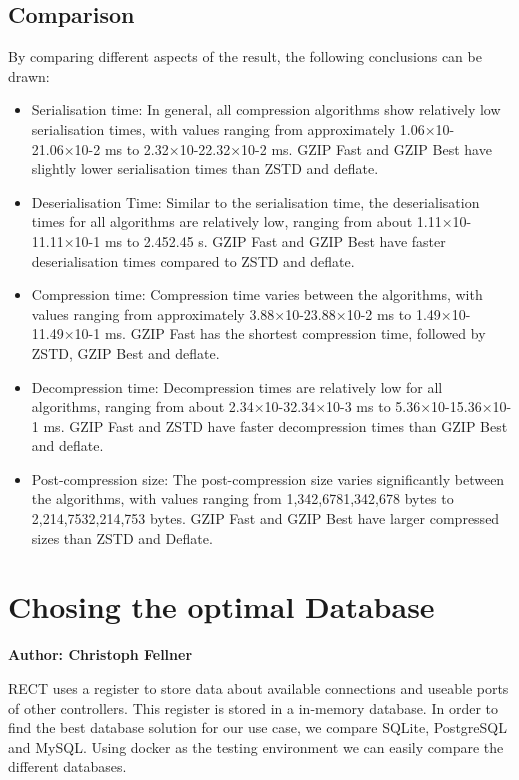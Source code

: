 \subsection{Comparison}
By comparing different aspects of the result, the following conclusions can be drawn: 

\begin{itemize}
\item Serialisation time: In general, all compression algorithms show relatively low serialisation times, with values ranging from approximately 1.06×10-21.06×10-2 ms to 2.32×10-22.32×10-2 ms. GZIP Fast and GZIP Best have slightly lower serialisation times than ZSTD and deflate.
\item Deserialisation Time: Similar to the serialisation time, the deserialisation times for all algorithms are relatively low, ranging from about 1.11×10-11.11×10-1 ms to 2.452.45 s. GZIP Fast and GZIP Best have faster deserialisation times compared to ZSTD and deflate.
\item Compression time: Compression time varies between the algorithms, with values ranging from approximately 3.88×10-23.88×10-2 ms to 1.49×10-11.49×10-1 ms. GZIP Fast has the shortest compression time, followed by ZSTD, GZIP Best and deflate.
\item Decompression time: Decompression times are relatively low for all algorithms, ranging from about 2.34×10-32.34×10-3 ms to 5.36×10-15.36×10-1 ms. GZIP Fast and ZSTD have faster decompression times than GZIP Best and deflate.
\item Post-compression size: The post-compression size varies significantly between the algorithms, with values ranging from 1,342,6781,342,678 bytes to 2,214,7532,214,753 bytes. GZIP Fast and GZIP Best have larger compressed sizes than ZSTD and Deflate.
\end{itemize}


\section{Chosing the optimal Database}
\textbf{Author: Christoph Fellner}

RECT uses a register to store data about available connections and useable ports of other controllers. This register is stored in a in-memory database. In order to find the 
best database solution for our use case, we compare SQLite, PostgreSQL and MySQL. Using docker as the testing environment we can easily compare the different databases.\newline

